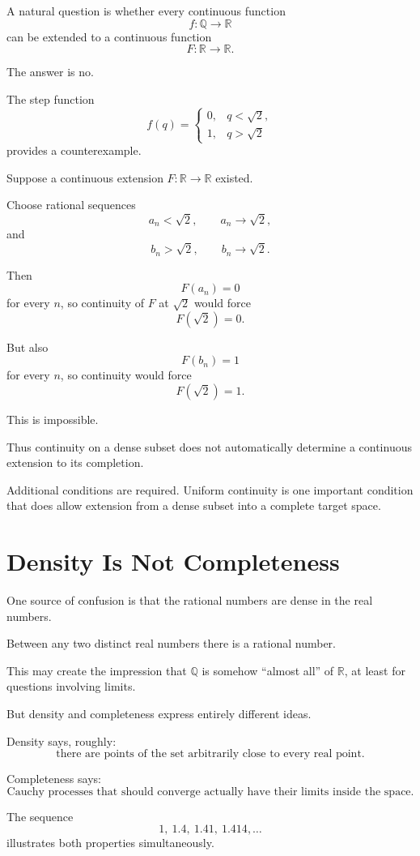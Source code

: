 \documentclass{essay}
\begin{document}
A natural question is whether every continuous function
\[
f:\mathbb{Q}\to\mathbb{R}
\]
can be extended to a continuous function
\[
F:\mathbb{R}\to\mathbb{R}.
\]

The answer is no.

The step function
\[
f(q)=
\begin{cases}
0,&q<\sqrt{2},\\
1,&q>\sqrt{2}
\end{cases}
\]
provides a counterexample.

Suppose a continuous extension \(F:\mathbb{R}\to\mathbb{R}\) existed.

Choose rational sequences
\[
a_n<\sqrt{2},
\qquad
a_n\to\sqrt{2},
\]
and
\[
b_n>\sqrt{2},
\qquad
b_n\to\sqrt{2}.
\]

Then
\[
F(a_n)=0
\]
for every \(n\), so continuity of \(F\) at \(\sqrt{2}\) would force
\[
F(\sqrt{2})=0.
\]

But also
\[
F(b_n)=1
\]
for every \(n\), so continuity would force
\[
F(\sqrt{2})=1.
\]

This is impossible.

Thus continuity on a dense subset does not automatically determine a
continuous extension to its completion.

Additional conditions are required. Uniform continuity is one important
condition that does allow extension from a dense subset into a complete target
space.

\section{Density Is Not Completeness}

One source of confusion is that the rational numbers are dense in the real
numbers.

Between any two distinct real numbers there is a rational number.

This may create the impression that \(\mathbb{Q}\) is somehow ``almost all''
of \(\mathbb{R}\), at least for questions involving limits.

But density and completeness express entirely different ideas.

Density says, roughly:
\[
\text{there are points of the set arbitrarily close to every real point.}
\]

Completeness says:
\[
\text{Cauchy processes that should converge actually have their limits
inside the space.}
\]

The sequence
\[
1,\ 1.4,\ 1.41,\ 1.414,\ldots
\]
illustrates both properties simultaneously.
\end{document}
